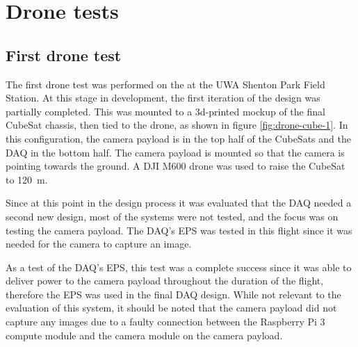 \documentclass[]{report}
\begin{document}
\section{Drone tests}
\subsection{First drone test}

The first drone test was performed on the  at the UWA Shenton Park Field Station. At this stage in development, the first iteration of the design was partially completed. This was mounted to a 3d-printed mockup of the final CubeSat chassis, then tied to the drone, as shown in figure \ref{fig:drone-cube-1}. In this configuration, the camera payload is in the top half of the CubeSats and the DAQ in the bottom half. The camera payload is mounted so that the camera is pointing towards the ground. A DJI M600 drone was used to raise the CubeSat to \SI{120}{\metre}.

Since at this point in the design process it was evaluated that the DAQ needed a second new design, most of the systems were not tested, and the focus was on testing the camera payload. The DAQ's EPS was tested in this flight since it was needed for the camera to capture an image.

As a test of the DAQ's EPS, this test was a complete success since it was able to deliver power to the camera payload throughout the duration of the flight, therefore the EPS was used in the final DAQ design. While not relevant to the evaluation of this system, it should be noted that the camera payload did not capture any images due to a faulty connection between the Raspberry Pi 3 compute module and the camera module on the camera payload.
\end{document}
